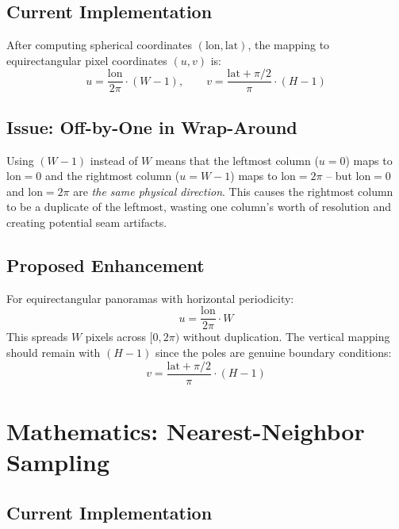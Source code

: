\documentclass[11pt,a4paper]{article}
\begin{document}
\subsection{Current Implementation}

After computing spherical coordinates $(\text{lon}, \text{lat})$, the mapping to equirectangular pixel coordinates $(u, v)$ is:
\begin{equation}
    u = \frac{\text{lon}}{2\pi} \cdot (W-1), \qquad
    v = \frac{\text{lat} + \pi/2}{\pi} \cdot (H-1)
\end{equation}

\subsection{Issue: Off-by-One in Wrap-Around}

Using $(W-1)$ instead of $W$ means that the leftmost column ($u=0$) maps to $\text{lon}=0$ and the rightmost column ($u=W-1$) maps to $\text{lon}=2\pi$ -- but $\text{lon}=0$ and $\text{lon}=2\pi$ are \emph{the same physical direction}.
This causes the rightmost column to be a duplicate of the leftmost, wasting one column's worth of resolution and creating potential seam artifacts.

\subsection{Proposed Enhancement}

For equirectangular panoramas with horizontal periodicity:
\begin{equation}
    u = \frac{\text{lon}}{2\pi} \cdot W
\end{equation}
This spreads $W$ pixels across $[0, 2\pi)$ without duplication.
The vertical mapping should remain with $(H-1)$ since the poles are genuine boundary conditions:
\begin{equation}
    v = \frac{\text{lat} + \pi/2}{\pi} \cdot (H-1)
\end{equation}

\section{Mathematics: Nearest-Neighbor Sampling}

\subsection{Current Implementation}
\end{document}
